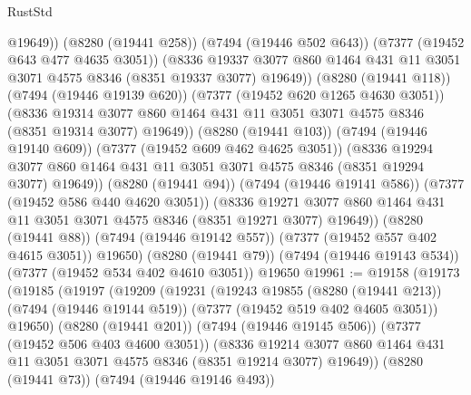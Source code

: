 \begin{lexlean}{RustStd}
\begin{coremodule}
                  @19649))
              (@8280 (@19441 @258))
              (@7494 (@19446 @502 @643))
              (@7377 (@19452 @643 @477 @4635 @3051))
              (@8336
                @19337
                @3077
                @860
                @1464
                @431
                @11
                @3051
                @3071
                @4575
                @8346
                (@8351 @19337 @3077)
                @19649))
            (@8280 (@19441 @118))
            (@7494 (@19446 @19139 @620))
            (@7377 (@19452 @620 @1265 @4630 @3051))
            (@8336
              @19314
              @3077
              @860
              @1464
              @431
              @11
              @3051
              @3071
              @4575
              @8346
              (@8351 @19314 @3077)
              @19649))
          (@8280 (@19441 @103))
          (@7494 (@19446 @19140 @609))
          (@7377 (@19452 @609 @462 @4625 @3051))
          (@8336
            @19294
            @3077
            @860
            @1464
            @431
            @11
            @3051
            @3071
            @4575
            @8346
            (@8351 @19294 @3077)
            @19649))
        (@8280 (@19441 @94))
        (@7494 (@19446 @19141 @586))
        (@7377 (@19452 @586 @440 @4620 @3051))
        (@8336
          @19271
          @3077
          @860
          @1464
          @431
          @11
          @3051
          @3071
          @4575
          @8346
          (@8351 @19271 @3077)
          @19649))
      (@8280 (@19441 @88))
      (@7494 (@19446 @19142 @557))
      (@7377 (@19452 @557 @402 @4615 @3051))
      @19650)
    (@8280 (@19441 @79))
    (@7494 (@19446 @19143 @534))
    (@7377 (@19452 @534 @402 @4610 @3051))
    @19650
@19961 := @19158
    (@19173
      (@19185
        (@19197
          (@19209
            (@19231
              (@19243
                @19855
                (@8280 (@19441 @213))
                (@7494 (@19446 @19144 @519))
                (@7377 (@19452 @519 @402 @4605 @3051))
                @19650)
              (@8280 (@19441 @201))
              (@7494 (@19446 @19145 @506))
              (@7377 (@19452 @506 @403 @4600 @3051))
              (@8336
                @19214
                @3077
                @860
                @1464
                @431
                @11
                @3051
                @3071
                @4575
                @8346
                (@8351 @19214 @3077)
                @19649))
            (@8280 (@19441 @73))
            (@7494 (@19446 @19146 @493))

\end{coremodule}
\end{lexlean}
